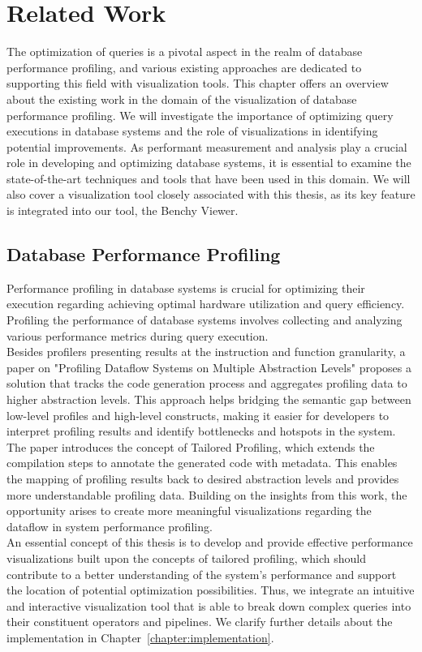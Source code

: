 
\chapter{Related Work}\label{chapter:relatedWork}
The optimization of queries is a pivotal aspect in the realm of database performance profiling, and various existing approaches are dedicated to supporting this field with visualization tools. This chapter offers an overview about the existing work in the domain of the visualization of database performance profiling.
We will investigate the importance of optimizing query executions in database systems and the role of visualizations in identifying potential improvements.
As performant measurement and analysis play a crucial role in developing and optimizing database systems, 
it is essential to examine the state-of-the-art techniques and tools that have been used in this domain.
We will also cover a visualization tool closely associated with this thesis, as its key feature is integrated into our tool, the Benchy Viewer.


\section{Database Performance Profiling }

Performance profiling in database systems is crucial for optimizing their execution regarding achieving optimal hardware utilization and query efficiency.
Profiling the performance of database systems involves collecting and analyzing various performance metrics during query execution.
\\Besides profilers presenting results at the instruction and function granularity, a paper on "Profiling Dataflow Systems on Multiple Abstraction Levels" \cite{profiling-dataflow} proposes a solution that tracks the code generation process and aggregates profiling data to higher abstraction levels. This approach helps bridging the semantic gap between low-level profiles and high-level constructs, making it easier for developers to interpret profiling results and identify bottlenecks and hotspots in the system. The paper introduces the concept of Tailored Profiling, which extends the compilation steps to annotate the generated code with metadata. This enables the mapping of profiling results back to desired abstraction levels and provides more understandable profiling data.
Building on the insights from this work, the opportunity arises to create more meaningful visualizations regarding the dataflow in system performance profiling.
\\ An essential concept of this thesis is to develop and provide effective performance visualizations built upon the concepts of tailored profiling, which should contribute to a better understanding of the system's performance and support the location of potential optimization possibilities. 
Thus, we integrate an intuitive and interactive visualization tool that is able to break down complex queries into their constituent operators and pipelines. We clarify further details about the implementation in Chapter~\ref{chapter:implementation}.

